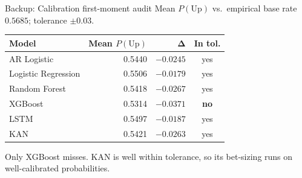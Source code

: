 \documentclass[aspectratio=169, t]{beamer}
\begin{document}
\begin{frame}{Backup: Calibration first-moment audit}
\vspace{-0.5em}
\centering
{\footnotesize Mean $P(\mathrm{Up})$ vs.\ empirical base rate $0.5685$; tolerance $\pm 0.03$.}
\vspace{0.5em}
\begin{center}
\renewcommand{\arraystretch}{1.25}
\scriptsize
\begin{tabular}{l r r c}
\toprule
\textbf{Model} & \textbf{Mean $P(\mathrm{Up})$} & $\mathbf{\Delta}$ & \textbf{In tol.} \\
\midrule
AR Logistic         & 0.5440 & $-0.0245$ & yes \\
Logistic Regression & 0.5506 & $-0.0179$ & yes \\
Random Forest       & 0.5418 & $-0.0267$ & yes \\
XGBoost             & 0.5314 & $-0.0371$ & \textbf{no} \\
LSTM                & 0.5497 & $-0.0187$ & yes \\
KAN                 & 0.5421 & $-0.0263$ & yes \\
\bottomrule
\end{tabular}
\end{center}
\vspace{0.3em}
{\scriptsize Only XGBoost misses. KAN is well within tolerance, so its bet-sizing runs on well-calibrated probabilities.}
\end{frame}
\end{document}
